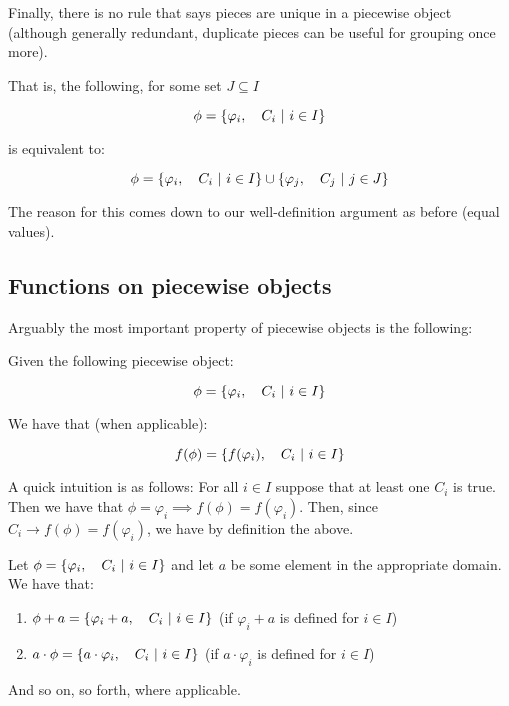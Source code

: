 \begin{theorem}
    Finally, there is no rule that says pieces are unique in a piecewise object (although generally redundant, duplicate pieces can be useful for grouping once more).

    That is, the following, for some set $J\subseteq I$

    $$
        \phi=\left\{\varphi_i,\quad C_i\ \middle|\ i\in I\right\}
    $$

    is equivalent to:

    $$
        \phi=\left\{\varphi_i,\quad C_i\ \middle|\ i\in I\right\}\cup\left\{\varphi_j,\quad C_j\ \middle|\ j\in J\right\}
    $$

    The reason for this comes down to our well-definition argument as before (equal values).
\end{theorem}
\subsection{Functions on piecewise objects}

Arguably the most important property of piecewise objects is the following:

\begin{theorem}
    Given the following piecewise object:

    $$
        \phi = \left\{\varphi_i,\quad C_i\ \middle|\ i\in I\right\}
    $$

    We have that (when applicable):

    $$
        f(\phi) = \left\{f(\varphi_i),\quad C_i\ \middle|\ i\in I\right\}
    $$

    A quick intuition is as follows: For all $i\in I$ suppose that at least one $C_i$ is true. Then we have that $\phi=\varphi_i\implies f(\phi)=f(\varphi_i)$. Then, since $C_i\rightarrow f(\phi)=f(\varphi_i)$, we have by definition the above.
\end{theorem}

\begin{theorem}
    Let $\phi=\left\{\varphi_i,\quad C_i\ \middle|\ i\in I\right\}$ and let $a$ be some element in the appropriate domain. We have that:

    \begin{enumerate}
        \item $\phi+a=\left\{\varphi_i+a,\quad C_i\ \middle|\ i\in I\right\}$ (if $\varphi_i+a$ is defined for $i\in I$)
        \item $a\cdot\phi=\left\{a\cdot\varphi_i,\quad C_i\ \middle|\ i\in I\right\}$ (if $a\cdot\varphi_i$ is defined for $i\in I$)
    \end{enumerate}

    And so on, so forth, where applicable.
\end{theorem}


